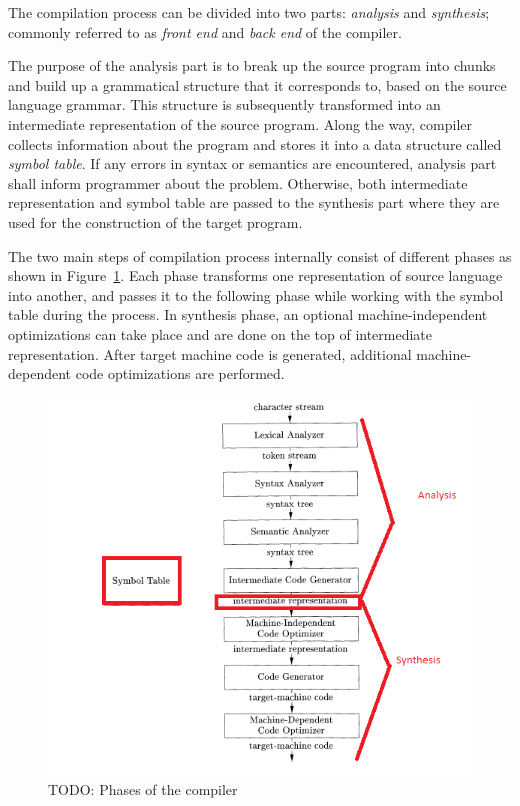 \documentclass[
  digital, %
  table,   %
  lof,     %
  lot,     %
  oneside,
]{fithesis3}
\begin{document}
The compilation process can be divided into two parts: \textit{analysis} and \textit{synthesis}; commonly referred to as \textit{front end} and \textit{back end} of the compiler.

The purpose of the analysis part is to break up the source program into chunks and build up a grammatical structure that it corresponds to, based on the source language grammar. This structure is subsequently transformed into an intermediate representation of the source program. Along the way, compiler collects information about the program and stores it into a data structure called \textit{symbol table}. If any errors in syntax or semantics are encountered, analysis part shall inform programmer about the problem. Otherwise, both intermediate representation and symbol table are passed to the synthesis part where they are used for the construction of the target program.

The two main steps of compilation process internally consist of different phases as shown in Figure~\ref{fig:compiler-phases}. Each phase transforms one representation of source language into another, and passes it to the following phase while working with the symbol table during the process. In synthesis phase, an optional machine-independent optimizations can take place and are done on the top of intermediate representation. After target machine code is generated, additional machine-dependent code optimizations are performed.

\begin{figure}[h!]
		\centering
			\includegraphics[scale=0.75]{img/compiler-phases}
		\caption{TODO: Phases of the compiler~\cite{dragon-book}}
		\label{fig:compiler-phases}
\end{figure}
\end{document}
